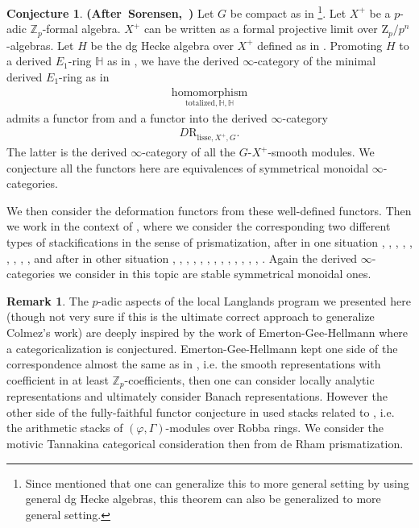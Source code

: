 \documentclass[12pt]{article}
\theoremstyle{definition}
\newtheorem{remark}{Remark}
\newtheorem{conjecture}{Conjecture}
\begin{document}
\begin{conjecture}\mbox{\textbf{(After Sorensen, \cite[Theorem 1.1]{So1})}}
Let $G$ be compact as in \cite{So1}\footnote{Since \cite{So1} mentioned that one can generalize this to more general setting by using general dg Hecke algebras, this theorem can also be generalized to more general setting.}. Let $X^+$ be a $p$-adic $\mathbb{Z}_p$-formal algebra. $X^+$ can be written as a formal projective limit over $\mathrm{Z}_p/p^n$-algebras. Let $H$ be the dg Hecke algebra over $X^+$ defined as in \cite{Sc1}. Promoting $H$ to a derived $E_1$-ring $\mathbb{H}$ as in \cite{Sa}, we have the derived $\infty$-category of the minimal derived $E_1$-ring as in \cite[Theorem 1.2]{Sa}
\begin{align}
\underset{{\mathrm{totalized},\mathbb{H},\mathbb{H}}}{\mathrm{homomorphism}}
\end{align}
admits a functor from and a functor into the derived $\infty$-category
\begin{align}
D\mathrm{R}_{\mathrm{lisse},X^+,G}.
\end{align}
The latter is the derived $\infty$-category of all the $G$-$X^+$-smooth modules. We conjecture all the functors here are equivalences of symmetrical monoidal $\infty$-categories.
\end{conjecture}

We then consider the deformation functors from these well-defined functors. Then we work in the context of \cite{1S5}, \cite{1S6} where we consider the corresponding two different types of stackifications in the sense of prismatization, after in one situation \cite{1To1}, \cite{1To2}, \cite{1To3}, \cite{1To4}, \cite{1S4}, \cite{1ALBRCS}, \cite{1BS}, \cite{1D}, \cite{1BL}, and after in other situation \cite{1KL}, \cite{1KL1}, \cite{1S1}, \cite{1S2}, \cite{1S3}, \cite{1F1}, \cite{1F2}, \cite{1T1}, \cite{1CSA}, \cite{1CSB}, \cite{1CS}, \cite{1BS1}, \cite{1BL1}, \cite{1BL2}. Again the derived $\infty$-categories we consider in this topic are stable symmetrical monoidal ones. 

\begin{remark}
The $p$-adic aspects of the local Langlands program we presented here (though not very sure if this is the ultimate correct approach to generalize Colmez's work) are deeply inspired by the work of Emerton-Gee-Hellmann \cite{EGH1} where a categoricalization is conjectured. Emerton-Gee-Hellmann kept one side of the correspondence almost the same as in \cite{1FS}, i.e. the smooth representations with coefficient in at least $\mathbb{Z}_p$-coefficients, then one can consider locally analytic representations and ultimately consider Banach representations. However the other side of the fully-faithful functor conjecture in \cite{EGH1} used stacks related to \cite{KPX}, i.e. the arithmetic stacks of $(\varphi,\Gamma)$-modules over Robba rings. We consider the motivic Tannakina categorical consideration then from de Rham prismatization. 
\end{remark}
\end{document}
